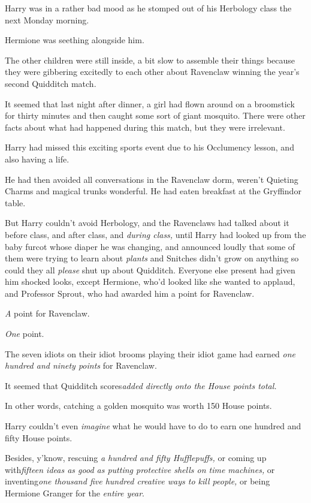 Harry was in a rather bad mood as he stomped out of his Herbology class
the next Monday morning.

Hermione was seething alongside him.

The other children were still inside, a bit slow to assemble their
things because they were gibbering excitedly to each other about
Ravenclaw winning the year's second Quidditch match.

It seemed that last night after dinner, a girl had flown around on a
broomstick for thirty minutes and then caught some sort of giant
mosquito. There were other facts about what had happened during this
match, but they were irrelevant.

Harry had missed this exciting sports event due to his Occlumency
lesson, and also having a life.

He had then avoided all conversations in the Ravenclaw dorm, weren't
Quieting Charms and magical trunks wonderful. He had eaten breakfast at
the Gryffindor table.

But Harry couldn't avoid Herbology, and the Ravenclaws had talked about
it before class, and after class, and \emph{during class,} until Harry
had looked up from the baby furcot whose diaper he was changing, and
announced loudly that some of them were trying to learn about
\emph{plants} and Snitches didn't grow on anything so could they all
\emph{please} shut up about Quidditch. Everyone else present had given
him shocked looks, except Hermione, who'd looked like she wanted to
applaud, and Professor Sprout, who had awarded him a point for
Ravenclaw.

\emph{A} point for Ravenclaw.

\emph{One} point.

The seven idiots on their idiot brooms playing their idiot game had
earned \emph{one hundred and ninety points} for Ravenclaw.

It seemed that Quidditch scores\emph{added directly onto the House
points total.}

In other words, catching a golden mosquito was worth 150 House points.

Harry couldn't even \emph{imagine} what he would have to do to earn one
hundred and fifty House points.

Besides, y'know, rescuing \emph{a hundred and fifty Hufflepuffs,} or
coming up with\emph{fifteen ideas as good as putting protective shells
on time machines,} or inventing\emph{one thousand five hundred creative
ways to kill people,} or being Hermione Granger for the \emph{entire
year}.

